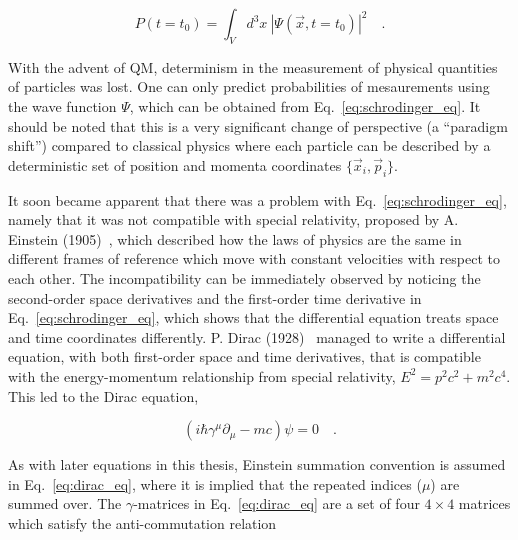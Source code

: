 \begin{equation}
    P(t=t_0)  = \int_{V} d^3 x \ |\Psi(\vec{x}, t=t_0)|^2 \quad .
\end{equation}

With the advent of QM, determinism in the measurement of physical quantities of particles was lost.
One can only predict probabilities of mesaurements using the wave function $\Psi$, which can
be obtained from Eq.~\ref{eq:schrodinger_eq}. It should be noted that this is a very significant change 
of perspective (a ``paradigm shift'') compared to classical physics where each particle can be described
by a deterministic set of position and momenta coordinates $\{\vec{x}_i, \vec{p}_i\}$. 

It soon became apparent that there was a problem with Eq.~\ref{eq:schrodinger_eq}, namely that it was not compatible
with special relativity, proposed by A. Einstein (1905)~\cite{Einstein:1905ve}, 
which described how the laws of physics are the same
in different frames of reference which move with constant velocities with respect to each other. The incompatibility
can be immediately observed by noticing the second-order space derivatives and the first-order time derivative in
Eq.~\ref{eq:schrodinger_eq}, which shows that the differential equation treats space and time coordinates differently.
P. Dirac (1928)~\cite{Dirac:1928hu} managed to write a differential equation, with both first-order space and 
time derivatives, that is compatible
with the energy-momentum relationship from special relativity, $E^2 = p^2 c^2 + m^2 c^4$. This led to the Dirac equation,

\begin{equation}
    \left( i\hbar \gamma^{\mu} \partial_{\mu} - mc \right) \psi = 0 \quad .
    \label{eq:dirac_eq}
\end{equation}

As with later equations in this thesis, Einstein summation convention is assumed in Eq.~\ref{eq:dirac_eq},
where it is implied that the repeated indices ($\mu$) are summed over.
The $\gamma$-matrices in Eq.~\ref{eq:dirac_eq} are a set of four $4\times 4$ matrices 
which satisfy the anti-commutation relation

